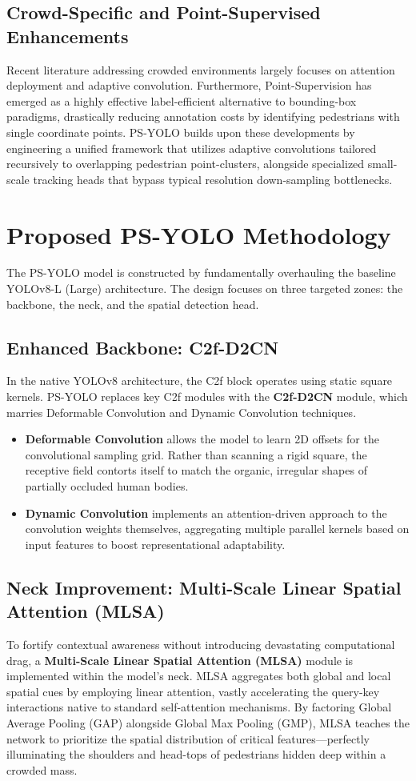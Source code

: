 \documentclass[11pt,a4paper]{article}
\begin{document}
\subsection{Crowd-Specific and Point-Supervised Enhancements}
Recent literature addressing crowded environments largely focuses on attention deployment and adaptive convolution. Furthermore, Point-Supervision has emerged as a highly effective label-efficient alternative to bounding-box paradigms, drastically reducing annotation costs by identifying pedestrians with single coordinate points. PS-YOLO builds upon these developments by engineering a unified framework that utilizes adaptive convolutions tailored recursively to overlapping pedestrian point-clusters, alongside specialized small-scale tracking heads that bypass typical resolution down-sampling bottlenecks.

\section{Proposed PS-YOLO Methodology}
The PS-YOLO model is constructed by fundamentally overhauling the baseline YOLOv8-L (Large) architecture. The design focuses on three targeted zones: the backbone, the neck, and the spatial detection head.

\subsection{Enhanced Backbone: C2f-D2CN}
In the native YOLOv8 architecture, the C2f block operates using static square kernels. PS-YOLO replaces key C2f modules with the \textbf{C2f-D2CN} module, which marries Deformable Convolution and Dynamic Convolution techniques.
\begin{itemize}
    \item \textbf{Deformable Convolution} allows the model to learn 2D offsets for the convolutional sampling grid. Rather than scanning a rigid square, the receptive field contorts itself to match the organic, irregular shapes of partially occluded human bodies.
    \item \textbf{Dynamic Convolution} implements an attention-driven approach to the convolution weights themselves, aggregating multiple parallel kernels based on input features to boost representational adaptability.
\end{itemize}

\subsection{Neck Improvement: Multi-Scale Linear Spatial Attention (MLSA)}
To fortify contextual awareness without introducing devastating computational drag, a \textbf{Multi-Scale Linear Spatial Attention (MLSA)} module is implemented within the model's neck. MLSA aggregates both global and local spatial cues by employing linear attention, vastly accelerating the query-key interactions native to standard self-attention mechanisms. By factoring Global Average Pooling (GAP) alongside Global Max Pooling (GMP), MLSA teaches the network to prioritize the spatial distribution of critical features---perfectly illuminating the shoulders and head-tops of pedestrians hidden deep within a crowded mass.
\end{document}
